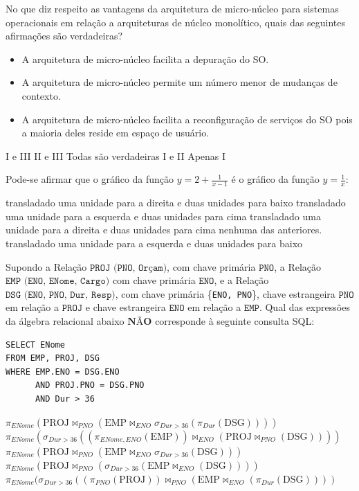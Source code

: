 \documentclass[12pt, addpoints]{exam}
\begin{document}
    \begin{questions}

    \newpage
    \question
No que diz respeito as vantagens da arquitetura de micro-núcleo para sistemas operacionais em relação a arquiteturas de núcleo monolítico, quais das seguintes afirmações são verdadeiras?

\begin{itemize}
    \item[I] A arquitetura de micro-núcleo facilita a depuração do SO.
    \item[II] A arquitetura de micro-núcleo permite um número menor de mudanças de contexto.
    \item[III] A arquitetura de micro-núcleo facilita a reconfiguração de serviços do SO pois a maioria deles reside em espaço de usuário.
\end{itemize}
\begin{choices}
\choice I e III
\choice II e III
\choice Todas são verdadeiras
\choice I e II
\choice Apenas I
\end{choices}

\question
Pode-se afirmar que o gráfico da função \(y = 2 + \frac{1}{x - 1}\) é o gráfico da função \(y = \frac{1}{x}\):
\begin{choices}
\choice transladado uma unidade para a direita e duas unidades para baixo
\choice transladado uma unidade para a esquerda e duas unidades para cima
\choice transladado uma unidade para a direita e duas unidades para cima
\choice nenhuma das anteriores.
\choice transladado uma unidade para a esquerda e duas unidades para baixo
\end{choices}

\question
Supondo a Relação $\texttt{PROJ (PNO, Orçam)}$, com chave primária $\texttt{PNO}$, a Relação $\texttt{EMP (ENO, ENome, Cargo)}$ com chave primária $\texttt{ENO}$, e a Relação $\texttt{DSG (ENO, PNO, Dur, Resp)}$, com chave primária \{\texttt{ENO, PNO}\}, chave estrangeira $\texttt{PNO}$ em relação a $\texttt{PROJ}$ e chave estrangeira $\texttt{ENO}$ em relação a $\texttt{EMP}$. Qual das expressões da álgebra relacional abaixo $\textbf{NÃO}$ corresponde à seguinte consulta SQL:

\begin{verbatim}
SELECT ENome
FROM EMP, PROJ, DSG
WHERE EMP.ENO = DSG.ENO
      AND PROJ.PNO = DSG.PNO
      AND Dur > 36
\end{verbatim}
\begin{choices}
\choice \( \pi_{ENome} (\text{PROJ} \Join_{PNO} (\text{EMP} \Join_{ENO} \sigma_{Dur > 36} (\pi_{Dur} (\text{DSG})))) \)
\choice \( \pi_{ENome} (\sigma_{Dur > 36} ((\pi_{ENome, ENO} (\text{EMP})) \Join_{ENO} (\text{PROJ} \Join_{PNO} (\text{DSG})))) \)
\choice \( \pi_{ENome} (\text{PROJ} \Join_{PNO} (\text{EMP} \Join_{ENO} \sigma_{Dur > 36} (\text{DSG}))) \)
\choice \( \pi_{ENome} (\text{PROJ} \Join_{PNO} (\sigma_{Dur > 36} (\text{EMP} \Join_{ENO} (\text{DSG})))) \)
\choice \( \pi_{ENome} (\sigma_{Dur > 36} ((\pi_{PNO} (\text{PROJ})) \Join_{PNO} (\text{EMP} \Join_{ENO} (\pi_{Dur} (\text{DSG})))) \)
\end{choices}


\end{questions}
\end{document}
